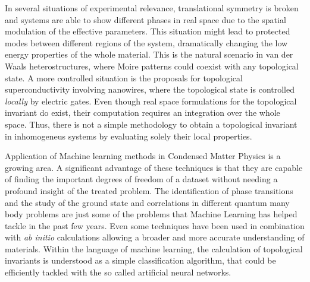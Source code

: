 In several situations of experimental relevance, translational symmetry is
broken and systems are able to show different phases in real space due to the
spatial modulation of the effective parameters.
This situation might lead to protected modes between different regions of the
system, dramatically changing the low energy properties of the whole material.
This is the natural scenario in van der Waals heterostructures, where Moire
patterns\cite{PhysRevB.90.075428,PhysRevB.96.085442,wang2016gaps} could coexist
with any topological state.\cite{sanchez2017helical,Young2014}
A more controlled situation is the proposals for topological superconductivity
involving nanowires, where the topological state is controlled \emph{locally} by
electric gates.\cite{Alicea2011,Gul20168}
Even though real space formulations for the topological invariant do
exist,\cite{PhysRevB.84.241106,PhysRevB.95.121114,loring2015k,mitchell2018amorphous,fulga2016aperiodic} their computation requires an
integration over the whole space. Thus,  there is not a simple
methodology to obtain a topological invariant  in inhomogeneus systems by
evaluating solely their local properties.


Application of Machine learning methods in Condensed Matter Physics
is a growing area.
A significant advantage of these techniques is that they are capable of finding the
important degrees of freedom of a dataset without needing a profound insight of
the treated problem.
The identification of phase transitions\cite{VanNieuwenburg2017,PhysRevX.7.031038,ohtsuki2016deep,PhysRevE.95.062122,broecker2017quantum,koch2017mutual}
and the study of the ground state and correlations in different quantum many
body
problems\cite{carleo2017solving,deng2016exact,PhysRevX.7.021021,PhysRevLett.118.216401,nagai2017self,PhysRevE.97.013306}
are just some of the problems that Machine Learning has helped tackle in the
past few years. Even some techniques have been used in combination with
\textit{ab initio} calculations allowing a broader and more accurate
understanding of
materials.\cite{PhysRevLett.108.058301,bartok2017machine,gao2016machine}
Within the language of machine learning, the calculation of topological
invariants is understood as a simple classification algorithm,\cite{Zhang2018,yoshioka2017learning}
that could be
efficiently tackled with the so called artificial neural networks.
\cite{alexnet2012,Dede20107,Lecun1998,Goldberg2015,Bengio2003,pybrain}


